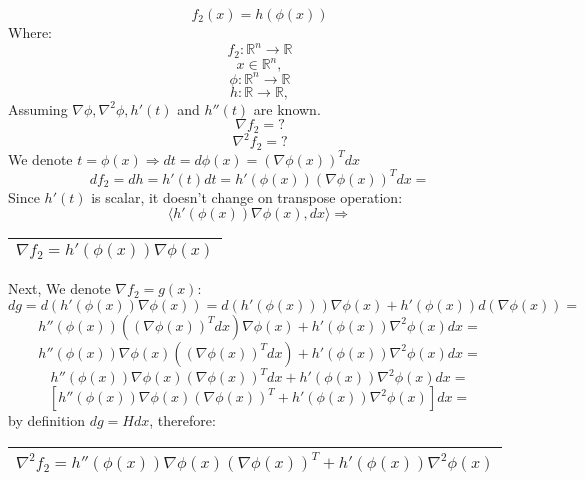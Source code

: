 \documentclass{article}
\begin{document}
$$f_2(x)=h(\phi(x))$$
Where:
$$f_2:\mathbb{R}^n \rightarrow \mathbb{R}$$
$$x \in \mathbb{R}^{n},$$
$$\phi:\mathbb{R}^n \rightarrow \mathbb{R}$$
$$h:\mathbb{R} \rightarrow \mathbb{R},$$
Assuming $\nabla\phi, \nabla^2\phi, h'(t)$ and $h''(t)$ are known.
$$\nabla f_2 = ?$$
$$\nabla^2 f_2 = ?$$
We denote $t=\phi(x)\Rightarrow dt=d\phi(x)=(\nabla \phi(x))^Tdx$
$$df_2= dh = h'(t)dt = h'(\phi(x))(\nabla \phi(x))^Tdx=$$
Since $h'(t)$ is scalar, it doesn't change on transpose operation:
$$\langle h'(\phi(x))\nabla \phi(x), dx \rangle \Rightarrow$$
\begin{center}
\begin{tabular}{ |c| }
\hline
$$ \nabla f_2 = h'(\phi(x))\nabla \phi(x)$$\\
\hline
\end{tabular}
\end{center}
Next, We denote $\nabla f_2= g(x)$:
$$dg = d(h'(\phi(x))\nabla \phi(x)) =  d(h'(\phi(x)))\nabla \phi(x) + h'(\phi(x))d(\nabla \phi(x))=$$
$$h''(\phi(x))((\nabla \phi(x))^Tdx)\nabla \phi(x) + h'(\phi(x))\nabla^2 \phi(x)dx=$$
$$h''(\phi(x))\nabla \phi(x)((\nabla \phi(x))^Tdx) + h'(\phi(x))\nabla^2 \phi(x)dx=$$
$$h''(\phi(x))\nabla \phi(x)(\nabla \phi(x))^Tdx + h'(\phi(x))\nabla^2 \phi(x)dx=$$
$$[h''(\phi(x))\nabla \phi(x)(\nabla \phi(x))^T + h'(\phi(x))\nabla^2 \phi(x)]dx=$$
by definition $dg=Hdx$, therefore:
\begin{center}
\begin{tabular}{ |c| }
\hline
$$ \nabla^2 f_2 = h''(\phi(x))\nabla \phi(x)(\nabla \phi(x))^T + h'(\phi(x))\nabla^2 \phi(x)$$\\
\hline
\end{tabular}
\end{center}
\newpage
\end{document}
